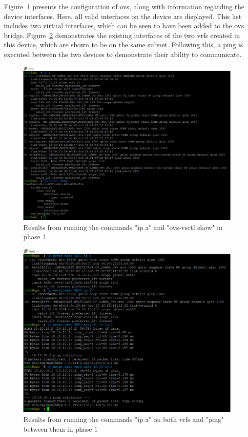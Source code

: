 Figure~\ref{fig:exp1_phase1_ovsctl_show} presents the configuration of \gls{ovs}, along with information regarding the device interfaces. Here, all valid interfaces on the device are displayed. This list includes two virtual interfaces, which can be seen to have been added to the \gls{ovs} bridge.
Figure~\ref{fig:exp1_phase1_pings} demonstrates the existing interfaces of the two \glspl{vrf} created in this device, which are shown to be on the same subnet. Following this, a ping is executed between the two devices to demonstrate their ability to communicate.

\begin{figure}
	\centering
	\includegraphics[width=\textwidth]{Chapters/Figures/tests/ovs_phase_1/device_ports&ovs_config.PNG}
	\caption{Results from running the commands "ip a" and "ovs-vsctl show" in phase 1}
	\label{fig:exp1_phase1_ovsctl_show}
\end{figure}

\begin{figure}
	\centering
	\includegraphics[width=\textwidth]{Chapters/Figures/tests/ovs_phase_1/VRF_config_&_pings.PNG}
	\caption{Results from running the commands "ip a" on both \glspl{vrf} and "ping" between them in phase 1}
	\label{fig:exp1_phase1_pings}
\end{figure}

